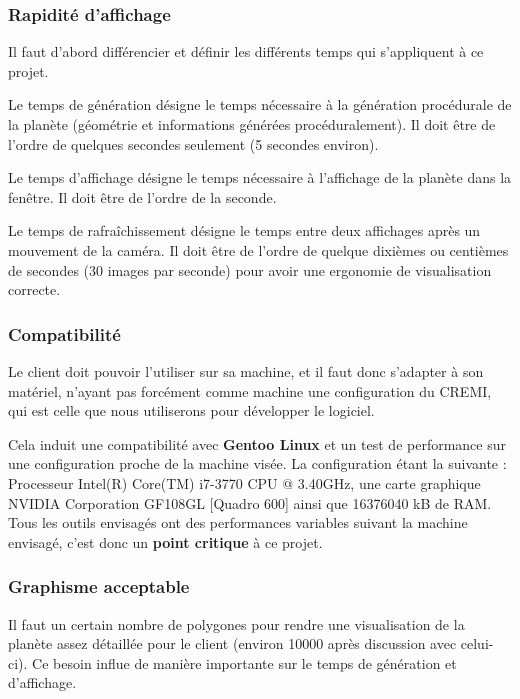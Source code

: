 \documentclass[a4paper]{article}
\begin{document}
        \subsubsection{Rapidité d'affichage}
        
         Il faut d'abord différencier et définir les différents temps qui s'appliquent à ce projet. 
     
         Le temps de génération désigne le temps nécessaire à la génération procédurale de la planète (géométrie et informations générées procéduralement). Il doit être de l'ordre de quelques secondes seulement (5 secondes environ).
         
         Le temps d'affichage désigne le temps nécessaire à l'affichage de la planète dans la fenêtre. Il doit être de l'ordre de la seconde.
         
         Le temps de rafraîchissement désigne le temps entre deux affichages après un mouvement de la caméra. Il doit être de l'ordre de quelque dixièmes ou centièmes de secondes (30 images par seconde) pour avoir une ergonomie de visualisation correcte.
        
        \subsubsection{Compatibilité} \label{Compatibilité}
        
        Le client doit pouvoir l'utiliser sur sa machine, et il faut donc s'adapter à son matériel, n'ayant pas forcément comme machine une configuration du CREMI, qui est celle que nous utiliserons pour développer le logiciel.
        
        Cela induit une compatibilité avec \textbf{Gentoo Linux} et un test de performance sur une configuration proche de la machine visée. La configuration étant la suivante : Processeur Intel(R) Core(TM) i7-3770 CPU @ 3.40GHz, une carte graphique NVIDIA Corporation GF108GL [Quadro 600] ainsi que 16376040 kB de RAM. Tous les outils envisagés ont des performances variables suivant la machine envisagé, c'est donc un \textbf{point critique} à ce projet.
        
        \subsubsection{Graphisme acceptable}
        
        \indent Il faut un certain nombre de polygones pour rendre une visualisation de la planète assez détaillée pour le client (environ 10000 après discussion avec celui-ci). Ce besoin influe de manière importante sur le temps de génération et d'affichage.
  
\end{document}
